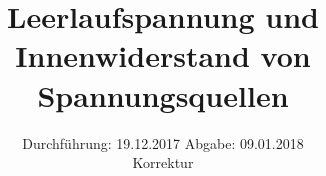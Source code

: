 

\subject{V301}
\title{Leerlaufspannung und Innenwiderstand von Spannungsquellen}
\date{%
  Durchführung: 19.12.2017
  \hspace{3em}
  Abgabe: 09.01.2018 \\
  Korrektur
}



\maketitle
\thispagestyle{empty}
\tableofcontents
\newpage






\printbibliography{}


